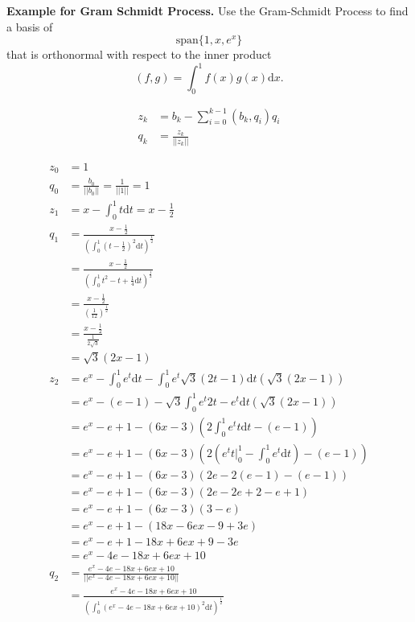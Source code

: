\textbf{Example for Gram Schmidt Process.} Use the Gram-Schmidt
Process to find a basis of \[\mathrm{span}\{1, x, e^x\}\] that is orthonormal
with respect to the inner product \[(f,g) = \int_0^1 f(x) g(x)
\mathrm{d}x.\]

{\color{blue}


\[
\begin{aligned}
z_k &= b_k - \sum_{i=0}^{k-1} (b_k, q_i) q_i \\
q_k &= \frac{z_k}{||z_k||}
\end{aligned}
\]

\begin{align*}
z_0 &= 1 \\
q_0 &= \frac{b_0}{|| b_0 ||} = \frac{1}{|| 1 ||} = \boxed{1}\\
z_1 &= x - \int_0^1 t \text{d}t
    = x - \frac{1}{2} \\
q_1 &= \frac{x - \frac{1}{2}}{(\int_0^1 (t - \frac{1}{2})^2 \text{d}t)^{\frac{1}{2}}} \\
    &= \frac{x - \frac{1}{2}}
    {(\int_0^1 t^2 - t + \frac{1}{4} \text{d}t)^{\frac{1}{2}}} \\
    &= \frac{x - \frac{1}{2}}
    {(\frac{1}{12})^{\frac{1}{2}}} \\
    &= \frac{x - \frac{1}{2}}
    {\frac{1}{2 \sqrt{3}}} \\
    &\boxed{= \sqrt{3}(2x - 1)}\\
z_2 &= e^x - \int_0^1 e^t \text{d}t - \int_0^1 e^t \sqrt{3} (2t - 1)
    \text{d}t (\sqrt{3} (2x-1)) \\
    &= e^x - (e - 1) - \sqrt{3} \int_0^1 e^t 2 t - e^t \text{d}t (\sqrt{3}
    (2x-1)) \\
    &= e^x - e + 1 - (6x - 3) (2 \int_0^1 e^t t \text{d}t - (e-1)) \\
    &= e^x - e + 1 - (6x - 3) (2 (e^t t \bigg|_0^1 - \int_0^1 e^t
    \text{d}t) - (e-1)) \\
    &= e^x - e + 1 - (6x - 3) (2 e - 2 (e-1) - (e-1)) \\
    &= e^x - e + 1 - (6x - 3) (2e - 2e + 2 - e + 1) \\
    &= e^x - e + 1 - (6x - 3) (3 - e) \\
    &= e^x - e + 1 - (18x - 6ex - 9 + 3e) \\
    &= e^x - e + 1 - 18x + 6ex + 9 - 3e \\
    &= e^x - 4e - 18x + 6ex + 10 \\
q_2 &= \frac{e^x - 4e - 18x + 6ex + 10}{|| e^x - 4e - 18x + 6ex + 10 ||}\\
    &= \frac{e^x - 4e - 18x + 6ex + 10}{(\int_0^1  (e^x - 4e - 18x + 6ex + 10)^2 \text{d}t)^{\frac{1}{2}}}\\

\end{align*}}
